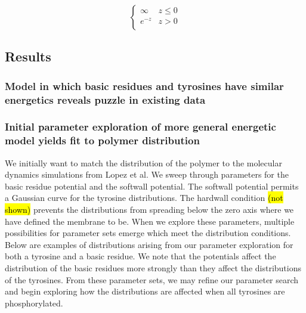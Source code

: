 \documentclass[../../AdvancementSummary.tex]{subfiles}
\begin{document}
\begin{equation}
\begin{cases}
\infty	& z \leq 0\\
e^{-z} & z > 0 \\
\end{cases}
\end{equation}


\subsection{Results}
\subsubsection{Model in which basic residues and tyrosines have similar energetics reveals puzzle in existing data}

\subsubsection{Initial parameter exploration of more general energetic model yields fit to polymer distribution}

We initially want to match the distribution of the polymer to the molecular dynamics simulations from Lopez et al. We sweep through parameters for the basic residue potential and the softwall potential. The softwall potential permits a Gaussian curve for the tyrosine distributions.  The hardwall condition \hl{(not shown)} prevents the distributions from spreading below the zero axis where we have defined the membrane to be. When we explore these parameters, multiple possibilities for parameter sets emerge which meet the distribution conditions. Below are examples of distributions arising from our parameter exploration for both a tyrosine and a basic residue. We note that the potentials affect the distribution of the basic residues more strongly than they affect the distributions of the tyrosines. From these parameter sets, we may refine our parameter search and begin exploring how the distributions are affected when all tyrosines are phosphorylated. 
\end{document}
